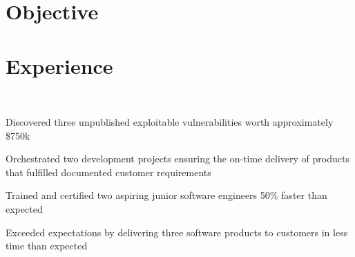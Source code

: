 \documentclass[]{resume}
\begin{document}
\begin{minipage}[t]{0.69\textwidth}

\sectionsep

\section{Objective}

\sectionsep

\section{Experience}

 \\
\vspace{\topsep} %
\begin{tightemize}
\item Discovered three unpublished exploitable vulnerabilities worth approximately \$750k
\item Orchestrated two development projects ensuring the on-time delivery of products that fulfilled documented customer requirements 
\item Trained and certified two aspiring junior software engineers 50\% faster than expected
\item Exceeded expectations by delivering three software products to customers in less time than expected
\end{tightemize}

\sectionsep


\end{minipage}
\end{document}
